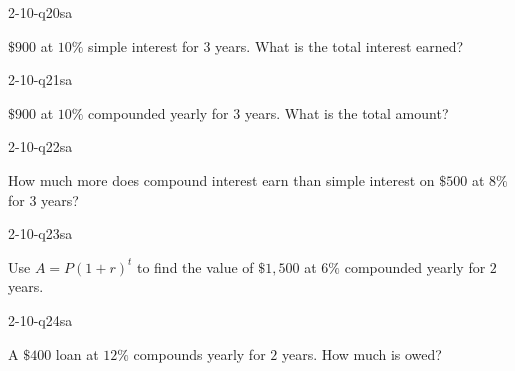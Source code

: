 \begin{practiceQuestion}{2-10-q20}{sa}
\begin{questionText}
$\$900$ at $10\%$ simple interest for $3$ years. What is the total interest earned?
\end{questionText}
\end{practiceQuestion}

\begin{practiceQuestion}{2-10-q21}{sa}
\begin{questionText}
$\$900$ at $10\%$ compounded yearly for $3$ years. What is the total amount?
\end{questionText}
\end{practiceQuestion}

\begin{practiceQuestion}{2-10-q22}{sa}
\begin{questionText}
How much more does compound interest earn than simple interest on $\$500$ at $8\%$ for $3$ years?
\end{questionText}
\end{practiceQuestion}

\begin{practiceQuestion}{2-10-q23}{sa}
\begin{questionText}
Use $A = P(1 + r)^t$ to find the value of $\$1{,}500$ at $6\%$ compounded yearly for $2$ years.
\end{questionText}
\end{practiceQuestion}

\begin{practiceQuestion}{2-10-q24}{sa}
\begin{questionText}
A $\$400$ loan at $12\%$ compounds yearly for $2$ years. How much is owed?
\end{questionText}
\end{practiceQuestion}

